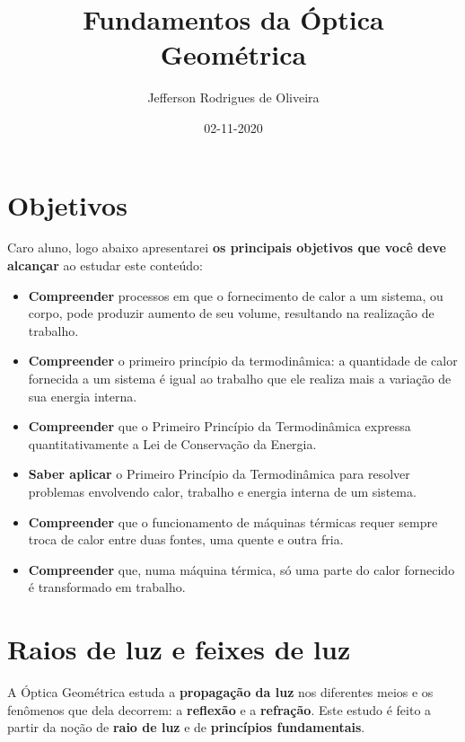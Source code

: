 \documentclass[11pt,twocolumn,oneside]{article}
\title{Fundamentos da Óptica Geométrica}
\author{Jefferson Rodrigues de Oliveira}
\date{02-11-2020}
\begin{document}
\maketitle
\tableofcontents
\hypertarget{x-objetivos}{\section{Objetivos}}
Caro aluno, logo abaixo apresentarei \textbf{os principais objetivos que você deve alcançar} ao estudar este conteúdo:


\begin{itemize}

\item \textbf{Compreender} processos em que o fornecimento de calor a um sistema, ou corpo, pode produzir aumento de seu volume, resultando na realização de trabalho.

\item \textbf{Compreender} o primeiro princípio da termodinâmica: a quantidade de calor fornecida a um sistema é igual ao trabalho que ele realiza mais a variação de sua energia interna.

\item \textbf{Compreender} que o Primeiro Princípio da Termodinâmica expressa quantitativamente a Lei de Conservação da Energia.

\item \textbf{Saber aplicar} o Primeiro Princípio da Termodinâmica para resolver problemas envolvendo calor, trabalho e energia interna de um sistema.

\item \textbf{Compreender} que o funcionamento de máquinas térmicas requer sempre troca de calor entre duas fontes, uma quente e outra fria.

\item \textbf{Compreender} que, numa máquina térmica, só uma parte do calor fornecido é transformado em trabalho.

\end{itemize}


\hypertarget{x-raios-de-luz-e-feixes-de-luz}{\section{Raios de luz e feixes de luz}}
A Óptica Geométrica estuda a \textbf{propagação da luz} nos diferentes meios e os fenômenos que dela decorrem: a \textbf{reflexão} e a \textbf{refração}. Este estudo é feito a partir da noção de \textbf{raio de luz} e de \textbf{princípios fundamentais}.
\end{document}
